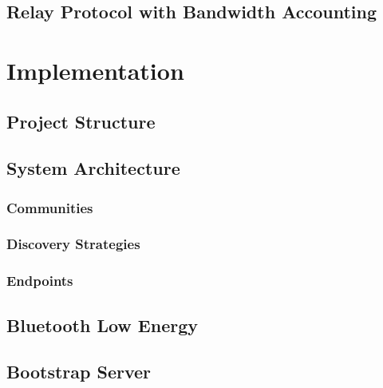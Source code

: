 \section{Relay Protocol with Bandwidth Accounting}

\chapter{Implementation}


\section{Project Structure}


\section{System Architecture}

\subsection{Communities}

\subsection{Discovery Strategies}

\subsection{Endpoints}

\section{Bluetooth Low Energy}

\section{Bootstrap Server}


